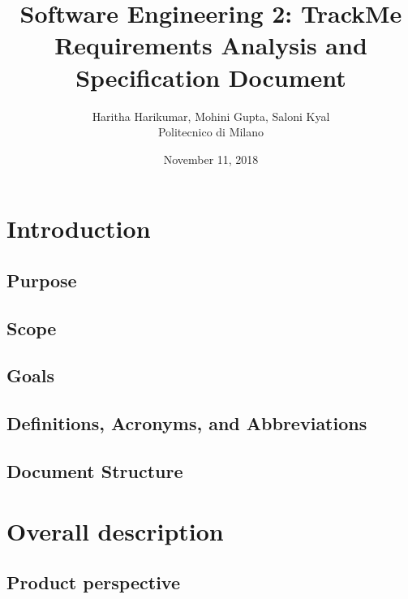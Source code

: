 \documentclass[12pt, a4paper]{report}
\begin{document}
\title{Software Engineering 2: TrackMe \\ \vspace{1em} Requirements Analysis and Specification Document}
\author{Haritha Harikumar, Mohini Gupta, Saloni Kyal\\
Politecnico di Milano}
\date{November 11, 2018}
\maketitle
\tableofcontents

\chapter{Introduction}
\label{ch:introduction}

\section{Purpose}


\section{Scope}


\section{Goals}


\section{Definitions, Acronyms, and Abbreviations}


\section{Document Structure}


\chapter{Overall description}
\label{ch:overall-desc}

\section{Product perspective}

\end{document}
